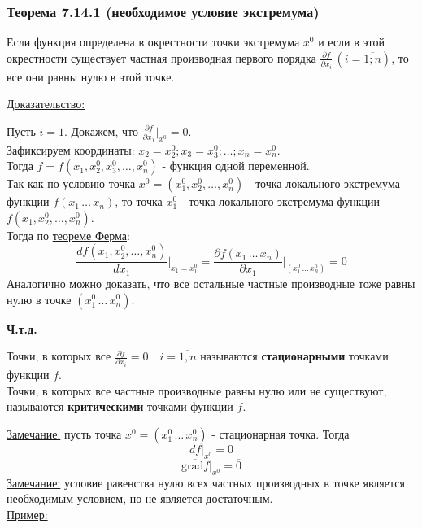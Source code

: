 \documentclass[12pt]{article}
\begin{document}
    \subsubsection*{Теорема 7.14.1 (необходимое условие экстремума)}\label{th:7.14.1}
    Если функция определена в окрестности точки экстремума $x^0$ и если в этой окрестности существует частная производная первого порядка $\frac{\partial f}{\partial x_i}\,(i = \overline{1;n})$, то все они равны нулю в этой точке.\par\noindent
    \underline{Доказательство:}
    \begin{adjustwidth}{1.5em}{1.5em}
        Пусть $i = 1$. Докажем, что $\frac{\partial f}{\partial x_1} \Big|_{x^0} = 0$.\\
        Зафиксируем координаты: $x_2 = x^0_2; x_3 = x^0_3; \dots; x_n = x^0_n$.\\
        Тогда $f = f(x_1, x^0_2, x^0_3, \dots, x^0_n)$ - функция одной переменной.\\
        Так как по условию точка $x^0 = (x^0_1, x^0_2, \dots, x^0_n)$ - точка локального экстремума функции $f(x_1\, \dots\, x_n)$, то точка $x^0_1$ - точка локального экстремума функции $f(x_1, x^0_2, \dots, x^0_n)$.\\
        Тогда по \hyperref[th:4.12.1]{теореме Ферма}:
        \[ \frac{df(x_1, x^0_2, \dots, x^0_n)}{dx_1} \Big|_{x_1 = x^0_1} = \frac{\partial f(x_1\, \dots\, x_n)}{\partial x_1} \Big|_{(x^0_1\, \dots\, x^0_n)} = 0 \]
        Аналогично можно доказать, что все остальные частные производные тоже равны нулю в точке $(x^0_1\, \dots\, x^0_n)$.
        \begin{center}
            \textbf{Ч.т.д.}
        \end{center}
    \end{adjustwidth}
    Точки, в которых все $\frac{\partial f}{\partial x_i} = 0 \quad i = \overline{1,n}$ называются \textbf{стационарными} точками функции $f$.\\
    Точки, в которых все частные производные равны нулю или не существуют, называются \textbf{критическими} точками функции $f$.\par\noindent
    \underline{Замечание:} пусть точка $x^0 = (x^0_1\, \dots\, x^0_n)$ - стационарная точка. Тогда
    \[ df \Big|_{x^0} = 0 \]
    \[ \overline{\text{grad}f} \Big|_{x^0} = \overline{0} \]
    \underline{Замечание:} условие равенства нулю всех частных производных в точке является необходимым условием, но не является достаточным.\\
    \underline{Пример:}
\end{document}
